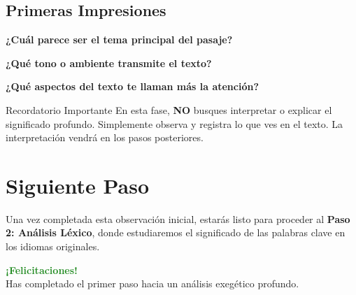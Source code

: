 \documentclass[11pt,a4paper]{article}
\begin{document}
\subsection{Primeras Impresiones}

\textbf{¿Cuál parece ser el tema principal del pasaje?}
\vspace{2cm}

\textbf{¿Qué tono o ambiente transmite el texto?}
\vspace{2cm}

\textbf{¿Qué aspectos del texto te llaman más la atención?}
\vspace{2cm}

\begin{infobox}{Recordatorio Importante}
En esta fase, \textbf{NO} busques interpretar o explicar el significado profundo. Simplemente observa y registra lo que ves en el texto. La interpretación vendrá en los pasos posteriores.
\end{infobox}

\section{Siguiente Paso}

Una vez completada esta observación inicial, estarás listo para proceder al \textbf{Paso 2: Análisis Léxico}, donde estudiaremos el significado de las palabras clave en los idiomas originales.

\vspace{1cm}

\begin{center}
\begin{tcolorbox}[colback=mintgreen!20, colframe=mintgreen, width=0.7\textwidth]
\centering
\textcolor{forestgreen}{\textbf{¡Felicitaciones!}}\\
\textcolor{papergray}{Has completado el primer paso hacia un análisis exegético profundo.}
\end{tcolorbox}
\end{center}
\end{document}
